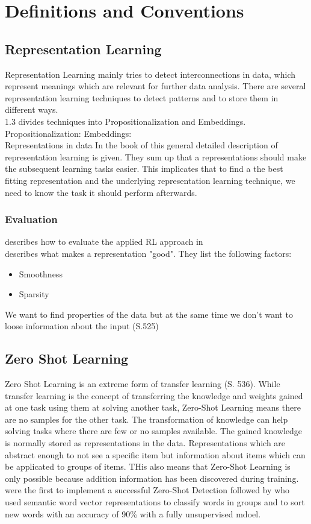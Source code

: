 \chapter{Definitions and Conventions}\label{theory}
\section{Representation Learning}
Representation Learning mainly tries to detect interconnections in data, which represent meanings which are relevant for further data analysis. There are several representation learning techniques to detect patterns and to store them in different ways.\\
\cite{lavrac_representation_2021} 1.3
divides techniques into Propositionalization and Embeddings.\\
Propositionalization:
Embeddings:\\
Representations in data
In the book of \cite{goodfellow_deep_2016} this general detailed description of representation learning is given. They sum up that a representations should make the subsequent learning tasks easier. This implicates that to find a the best fitting representation and the underlying representation learning technique, we need to know the task it should perform afterwards.
\subsection{Evaluation}
describes how to evaluate the applied RL approach in\\
\cite{bengio_representation_2013} describes what makes a representation "good". They list the following factors:\\
\begin{itemize}
  \item Smoothness
  \item Sparsity
\end{itemize}We want to find properties of the data but at the same time we don't want to loose information about the input \cite{goodfellow_deep_2016} (S.525)
\section{Zero Shot Learning}
Zero Shot Learning is an extreme form of transfer learning \cite{goodfellow_deep_2016} (S. 536). While transfer learning is the concept of transferring the knowledge and weights gained at one task using them at solving another task, Zero-Shot Learning means there are no samples for the other task. The transformation of knowledge can help solving tasks where there are few or no samples available. The gained knowledge is normally stored as representations in the data. Representations which are abstract enough to not see a specific item but information about items which can be applicated to groups of items. THis also means that Zero-Shot Learning is only possible because addition information has been discovered during training.\\
\cite{palatucci_zero-shot_2009} were the first to implement a successful Zero-Shot Detection followed by \cite{socher_zero-shot_2013} who used semantic word vector representations to classify words in groups and to sort new words with an accuracy of 90\% with a fully unsupervised mdoel.
